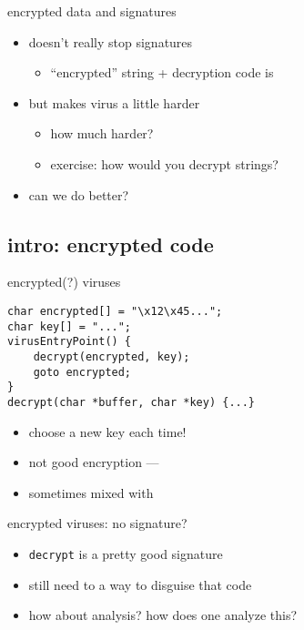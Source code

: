 \begin{frame}{encrypted data and signatures}
    \begin{itemize}
    \item doesn't really stop signatures
        \begin{itemize}
        \item ``encrypted'' string + decryption code is 
        \end{itemize}
    \item but makes  virus a little harder
        \begin{itemize}
        \item how much harder?
        \item exercise: how would you decrypt strings?
        \end{itemize}
    \vspace{.5cm}
    \item<2-> can we do better?
    \end{itemize}
\end{frame}

\subsection{intro: encrypted code}

\begin{frame}[fragile,label=encrypted]{encrypted(?) viruses}
\lstset{language=C,style=small}
\begin{lstlisting}
char encrypted[] = "\x12\x45...";
char key[] = "...";
virusEntryPoint() {
    decrypt(encrypted, key);
    goto encrypted;
}
decrypt(char *buffer, char *key) {...}
\end{lstlisting}
\begin{itemize}
    \item choose a new key each time!
    \item not good encryption --- 
    \item sometimes mixed with 
\end{itemize}
\end{frame}

\begin{frame}{encrypted viruses: no signature?}
    \begin{itemize}
    \item {\tt decrypt} is a pretty good signature
    \item still need to a way to disguise that code
    \vspace{.5cm}
    \item how about analysis? how does one analyze this?
    \end{itemize}
\end{frame}

